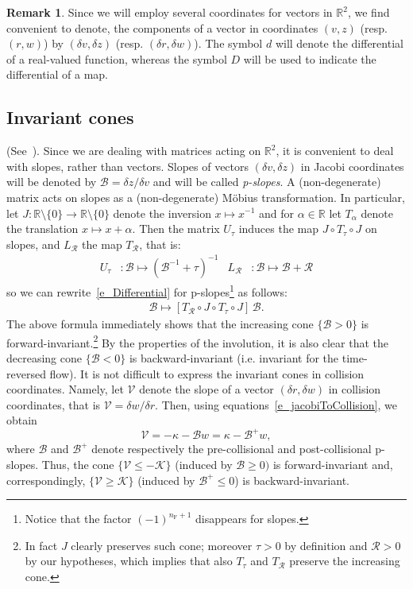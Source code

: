 \documentclass[10pt]{amsart}
\theoremstyle{definition}\newtheorem{defi}[theo]{Definition}\newtheorem{rema}[theo]{Remark}\newtheorem{exam}[theo]{Example}\newtheorem{exem}[theo]{Example}\newtheorem{nota}[theo]{Notation}
\newcommand{\ct}{r}
\newcommand{\fft}{\tau}
\newcommand{\curv}{\kappa}
\newcommand{\inv}{^{-1}}
\newcommand{\fixw}{\mathrm{F}}
\newcommand{\reals}{\mathbb{R}}
\newcommand{\bR}{\mathbb{R}}
\newcommand{\cB}{\mathcal{B}}
\newcommand{\cK}{\mathcal{K}}
\newcommand{\cpar}{\mathcal{R}}
\newcommand{\pslope}{\mathcal{B}}
\newcommand{\cslope}{\mathcal{V}}
\newcommand{\ppPrivate}[2]{#1^{#2}}
\newcommand{\prePrivate}[1]{\ppPrivate{#1}{-}}
\newcommand{\postPrivate}[1]{\ppPrivate{#1}{+}}
\newcommand{\prpslope}{\prePrivate{\pslope}}
\newcommand{\popslope}{\postPrivate{\pslope}}
\renewcommand{\prpslope}{\cB}
\renewcommand{\prpslope}{\cB}
\renewcommand{\prpslope}{\cB}
\begin{document}
\begin{rema}
Since we will employ several coordinates for vectors in $\bR^{2}$, we find convenient to denote, the components of a vector in coordinates $(v,z)$ (resp. $(\ct,w)$) by $(\delta v,\delta z)$ (resp. $(\delta\ct,\delta w)$). The symbol $d$ will denote the differential of a real-valued function, whereas the symbol $D$ will be used to indicate the differential of a map.
\end{rema}

\subsection{Invariant cones}\label{s_invariantCones}

(See~\cite[\S3.8]{ChM}). Since we are dealing with matrices acting on $\bR^2$, it is convenient to deal with slopes, rather than vectors. Slopes of vectors $(\delta v,\delta z)$ in Jacobi coordinates will be denoted by $\pslope= \delta z/\delta v$ and will be called \emph{p-slopes}. A (non-degenerate) matrix acts on slopes as a (non-degenerate) M\"obius transformation. In particular, let $J:\reals\setminus\{0\}\to\reals\setminus\{0\}$ denote the inversion $x\mapsto x\inv$ and for $\alpha\in\bR$ let $T_\alpha$ denote the translation $x\mapsto x+\alpha$. Then the matrix $U_\fft$ induces the map $J\circ T_\fft\circ J$ on slopes, and $L_\cpar$ the map $T_\cpar$, that is:
\begin{align}\label{e_slopeEvolution}
U_\fft & :\pslope\mapsto{\left(\pslope\inv+\fft\right)}\inv & L_\cpar & :\pslope\mapsto\pslope + \cpar
\end{align}
so we can rewrite~\eqref{e_Differential} for p-slopes\footnote{Notice that the factor $ {(-1)}^{n_\fixw+1}$ disappears for slopes.} as follows:
\begin{align}\label{e_evolutionB}
\pslope\mapsto \left[T_{\cpar}\circ J\circ T_{\fft}\circ J\right]\,\pslope.
\end{align}
The above formula immediately shows that the increasing cone $\{\pslope>0\}$ is forward-invariant.\footnote{In fact $J$ clearly preserves such cone; moreover $\fft>0$ by definition and $\cpar>0$ by our hypotheses, which implies that also $T_\fft$ and $T_\cpar$ preserve the increasing cone.}
By the properties of the involution, it is also clear that the decreasing cone $\{\pslope<0\}$ is backward-invariant (i.e. invariant for the time-reversed flow). It is not difficult to express the invariant cones in collision coordinates. Namely, let $\cslope$ denote the slope of a vector $(\delta\ct,\delta w)$ in collision coordinates, that is $\cslope = \delta w/\delta\ct$. Then, using equations~\eqref{e_jacobiToCollision}, we obtain
\begin{equation}\label{e_slopeCollision}
\cslope = - \curv - \prpslope w = \curv - \popslope w,
\end{equation}
where $\prpslope$ and $\popslope$ denote respectively the pre-collisional and post-collisional p-slopes. Thus, the cone $\{\cslope \leq -\cK\}$ (induced by $\prpslope\geq 0)$ is forward-invariant and, correspondingly, $\{\cslope\geq\cK\}$ (induced by $\popslope\leq0$) is backward-invariant.
\end{document}
